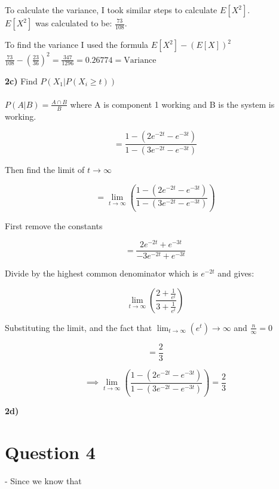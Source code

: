 \documentclass[oneside, a4paper]{article}
\begin{document}
To calculate the variance, I took similar steps to calculate $E[X^2]$. \\
$E[X^2]$ was calculated to be: $\frac{73}{108}$. 

To find the variance I used the formula $E[X^2] - (E[X])^2$\\
$\frac{73}{108} - (\frac{23}{36})^2 = \frac{347}{1296} = 0.26774 = \text{Variance}$

\textbf{2c)} Find $P(X_1 | P(X_i \geq t))$\\ \\
$P(A|B) = \frac{A \cap B}{B}$ where A is component 1 working and B is the system is working.

$$ = \frac{1-\left(2e^{-2t}-e^{-3t}\right)}{1-\left(3e^{-2t}-e^{-3t}\right)}$$

Then find the limit of $t \to \infty$

$$ = \lim _{t\to \infty }\left(\frac{1-\left(2e^{-2t}-e^{-3t}\right)}{1-\left(3e^{-2t}-e^{-3t}\right)}\right)$$

First remove the constants

$$ = \frac{2e^{-2t}+e^{-3t}}{-3e^{-2t}+e^{-3t}} $$

Divide by the highest common denominator which is $e^{-2t}$ and gives:

$$\lim _{t\to \infty }\left(\frac{2+\frac{1}{e^t}}{3+\frac{1}{e^t}}\right)$$

Substituting the limit, and the fact that $\lim _{t\to \infty }\left(e^t\right) \to \infty $ and $\frac{n}{\infty} = 0$

$$ = \frac{2}{3}$$

$$\implies \lim _{t\to \infty }\left(\frac{1-\left(2e^{-2t}-e^{-3t}\right)}{1-\left(3e^{-2t}-e^{-3t}\right)}\right) = \frac{2}{3}$$

\textbf{2d)}



\newpage


\section{Question 4}
- Since we know that 
\end{document}
